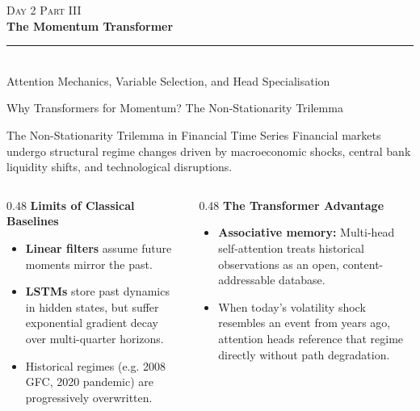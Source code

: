 \documentclass[10pt]{beamer}
\begin{document}
\begin{frame}[plain]
  \vfill
  \centering
  {\scriptsize\scshape\color{darkteal!70!black} Day 2 \quad\textbar\quad Part III}\\[0.35cm]
  {\large\bfseries\color{darkteal} The Momentum Transformer}\\[0.25cm]
  {\color{darkteal!40!black}\rule{3.5cm}{0.4pt}}\\[0.3cm]
  {\footnotesize\color{black!70} Attention Mechanics, Variable Selection, and Head Specialisation}
  \vfill
\end{frame}

\begin{frame}{Why Transformers for Momentum? The Non-Stationarity Trilemma}
  \begin{block}{The Non-Stationarity Trilemma in Financial Time Series}
    Financial markets undergo structural regime changes driven by macroeconomic shocks, central bank liquidity shifts, and technological disruptions.
  \end{block}
  \vspace{0.1cm}
  \begin{columns}[t]
    \begin{column}{0.48\textwidth}
      \textbf{\scriptsize Limits of Classical Baselines}
      \begin{itemize}\scriptsize
        \item \textbf{Linear filters} assume future moments mirror the past.
        \item \textbf{LSTMs} store past dynamics in hidden states, but suffer exponential gradient decay over multi-quarter horizons.
        \item Historical regimes (e.g. 2008 GFC, 2020 pandemic) are progressively overwritten.
      \end{itemize}
    \end{column}
    \begin{column}{0.48\textwidth}
      \textbf{\scriptsize The Transformer Advantage}
      \begin{itemize}\scriptsize
        \item \textbf{Associative memory:} Multi-head self-attention treats historical observations as an open, content-addressable database.
        \item When today's volatility shock resembles an event from years ago, attention heads reference that regime directly without path degradation.
      \end{itemize}
    \end{column}
  \end{columns}
\end{frame}
\end{document}
